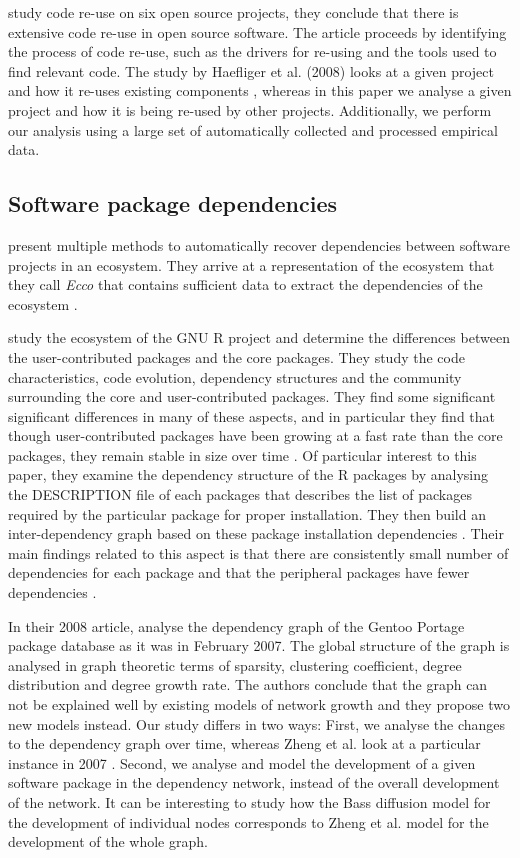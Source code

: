 \documentclass[smallextended,final]{svjour3}
\begin{document}
\citet{haefliger08} study code re-use on six open source projects, they conclude that there is extensive code re-use in open source software. The article proceeds by identifying the process of code re-use, such as the drivers for re-using and the tools used to find relevant code. The study by Haefliger et al. (2008) looks at a given project and how it  re-uses existing components \citep{haefliger08}, whereas in this paper we analyse a given project and how it is being re-used by other projects. Additionally, we perform our analysis using a large set of automatically collected and processed empirical data.

\subsection{Software package dependencies}

\citet{lungu10} present multiple methods to automatically recover dependencies between software projects in an ecosystem. They arrive at a representation of the ecosystem that they call \textit{Ecco} that contains sufficient data to extract the dependencies of the ecosystem \citep{lungu10}.

\citet{german13} study the ecosystem of the GNU R project and determine the differences between the user-contributed packages and the core packages. They study the code characteristics, code evolution, dependency structures and the community surrounding the core and user-contributed packages. They find some significant significant differences in many of these aspects, and in particular they find that though user-contributed packages have been growing at a fast rate than the core packages, they remain stable in size over time \citep{german13}. Of particular interest to this paper, they examine the dependency structure of the R packages by analysing the DESCRIPTION file of each packages that describes the list of packages required by the particular package for proper installation. They then build an inter-dependency graph based on these package installation dependencies \citep{german13}. Their main findings related to this aspect is that there are consistently small number of dependencies for each package and that the peripheral packages have fewer dependencies \citep{german13}.

In their 2008 article, \citet{zheng08} analyse the dependency graph of the Gentoo Portage package database as it was in February 2007. The global structure of the graph is analysed in graph theoretic terms of sparsity, clustering coefficient, degree distribution and degree growth rate. The authors conclude that the graph can not be explained well by existing models of network growth and they propose two new models instead. Our study differs in two ways: First, we analyse the changes to the dependency graph over time, whereas Zheng et al. look at a particular instance in 2007 \citep{zheng08}. Second, we analyse and model the development of a given software package in the dependency network, instead of the overall development of the network. It can be interesting to study how the Bass diffusion model for the development of individual nodes corresponds to Zheng et al. model for the development of the whole graph.
\end{document}
